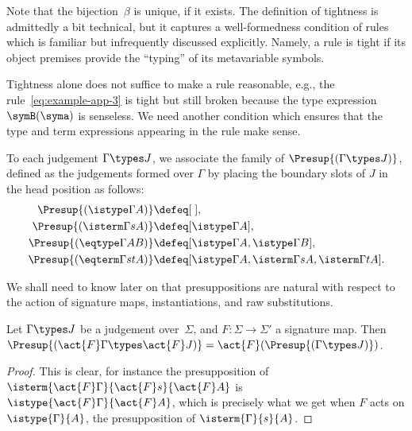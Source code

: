 Note that the bijection~$\beta$ is unique, if it exists.
%
The definition of tightness is admittedly a bit technical, but it captures a well-formedness condition of rules which is familiar but infrequently discussed explicitly. Namely, a rule is tight if its object premises provide the ``typing'' of its metavariable symbols.

Tightness alone does not suffice to make a rule reasonable, e.g., the rule~\eqref{eq:example-app-3} is tight but still broken because the type expression $\symB(\syma)$ is senseless. We need another condition which ensures that the type and term expressions appearing in the rule make sense.

\begin{definition}
  To each judgement $\Gamma \types J$, we associate the family of  $\Presup {(\Gamma \types J)}$, defined as the judgements formed over $\Gamma$ by placing the boundary slots of $J$ in the head position as follows:
  \begin{align*}
  \Presup {(\istype \Gamma A)} &\defeq [ \; ], \\
  \Presup {(\isterm \Gamma s A)} &\defeq [ \istype \Gamma A ], \\
  \Presup {(\eqtype \Gamma A B)} &\defeq [ \istype \Gamma A, \istype \Gamma B ], \\
  \Presup {(\eqterm \Gamma s t A)} &\defeq [ \istype \Gamma A, \isterm \Gamma s A, \isterm \Gamma t A ].
  \end{align*}
\end{definition}

We shall need to know later on that presuppositions are natural with respect to the action of signature maps, instantiations, and raw substitutions.

\begin{proposition}
  \label{prop:presuppositions-action-signature-map}
  Let $\Gamma \types J$ be a judgement over~$\Sigma$, and $F : \Sigma \to \Sigma'$ a signature map. Then $\Presup {(\act{F} \Gamma \types \act{F} J)} = \act{F}(\Presup {(\Gamma \types J)})$.
\end{proposition}

\begin{proof}
  This is clear, for instance the presupposition of $\isterm{\act{F} \Gamma}{\act{F} s}{\act{F} A}$ is $\istype{\act{F} \Gamma}{\act{F} A}$, which is precisely what we get when $F$ acts on $\istype{\Gamma}{A}$, the presupposition of $\isterm{\Gamma}{s}{A}$.
\end{proof}

